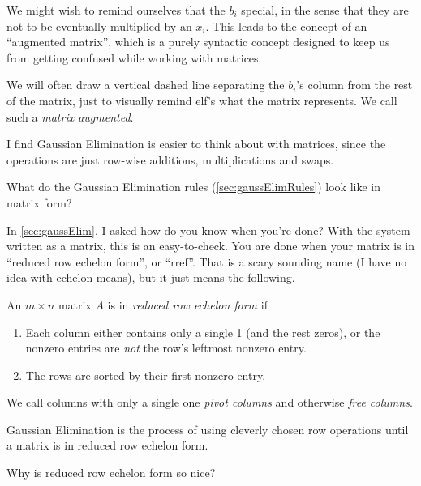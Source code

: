 We might wish to remind ourselves that the $b_i$ special, in the sense that they are not to be eventually multiplied by an $x_i$.  
This leads to the concept of an ``augmented matrix'', which is a purely syntactic concept designed to keep us from getting confused while working with matrices.  

\begin{Def}
  We will often draw a vertical dashed line separating the $b_i$'s column from the rest of the matrix, just to visually remind elf's what the matrix represents.  
  We call such a \emph{matrix augmented}.  
\end{Def}

I find Gaussian Elimination is easier to think about with matrices, since the operations are just row-wise additions, multiplications and swaps.  
\begin{Ex}
  What do the Gaussian Elimination rules (\ref{sec:gaussElimRules}) look like in matrix form?  
\end{Ex}

In \ref{sec:gaussElim}, I asked how do you know when you're done?  
With the system written as a matrix, this is an easy-to-check.   
You are done when your matrix is in ``reduced row echelon form'', or ``rref''.  
That is a scary sounding name (I have no idea with echelon means), but it just means the following.
\begin{Def}
  An $m\times n$ matrix $A$ is in \emph{reduced row echelon form} if
  \begin{enumerate}
  \item Each column either contains only a single 1 (and the rest zeros), or the nonzero entries are \emph{not} the row's leftmost nonzero entry.
  \item The rows are sorted by their first nonzero entry.
  \end{enumerate}
  We call columns with only a single one \emph{pivot columns} and otherwise \emph{free columns}.  
\end{Def}

\begin{Def}
  Gaussian Elimination is the process of using cleverly chosen row operations until a matrix is in reduced row echelon form.  
\end{Def}

Why is reduced row echelon form so nice?  

